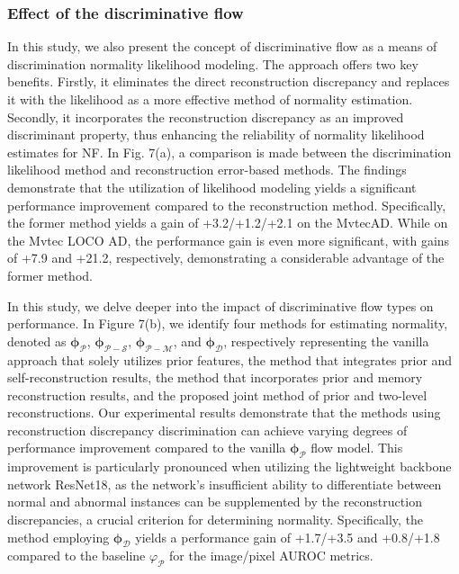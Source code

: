 \documentclass[journal]{IEEEtran}
\begin{document}
 
\subsubsection{Effect of the discriminative flow}

In this study, we also present the concept of discriminative flow as a means of discrimination normality likelihood modeling. The approach offers two key benefits. Firstly, it eliminates the direct reconstruction discrepancy and replaces it with the likelihood as a more effective method of normality estimation. Secondly, it incorporates the reconstruction discrepancy as an improved discriminant property, thus enhancing the reliability of normality likelihood estimates for NF. In Fig. 7(a), a comparison is made between the discrimination likelihood method and reconstruction error-based methods. The findings demonstrate that the utilization of likelihood modeling yields a significant performance improvement compared to the reconstruction method. Specifically, the former method yields a gain of +3.2/+1.2/+2.1 on the MvtecAD. While on the Mvtec LOCO AD, the performance gain is even more significant, with gains of +7.9 and +21.2, respectively, demonstrating a considerable advantage of the former method.

In this study, we delve deeper into the impact of discriminative flow types on performance. In Figure 7(b), we identify four methods for estimating normality, denoted as $\boldsymbol{\phi_{\mathcal{P}}}$, $\boldsymbol{\phi_{\mathcal{P-S}}}$, $\boldsymbol{\phi_{\mathcal{P-M}}}$, and $\boldsymbol{\phi_{\mathcal{D}}}$, respectively representing the vanilla approach that solely utilizes prior features, the method that integrates prior and self-reconstruction results, the method that incorporates prior and memory reconstruction results, and the proposed joint method of prior and two-level reconstructions. Our experimental results demonstrate that the methods using reconstruction discrepancy discrimination can achieve varying degrees of performance improvement compared to the vanilla $\boldsymbol{\phi_{\mathcal{P}}}$ flow model. This improvement is particularly pronounced when utilizing the lightweight backbone network ResNet18, as the network's insufficient ability to differentiate between normal and abnormal instances can be supplemented by the reconstruction discrepancies, a crucial criterion for determining normality. Specifically, the method employing $\boldsymbol{\phi_{\mathcal{D}}}$ yields a performance gain of +1.7/+3.5 and +0.8/+1.8 compared to the baseline $\varphi_{\mathcal{P}}$ for the image/pixel AUROC metrics.
\end{document}
